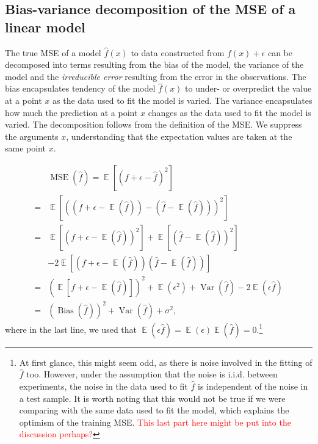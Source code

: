 \documentclass[twocolumn,english,notitlepage]{article}
\newcommand{\comment}[1]{\textcolor{red}{#1}}
\newcommand{\pclosed}[1]{\left(#1\right)}
\newcommand{\bclosed}[1]{\left[#1\right]}
\renewcommand{\expval}{\operatorname{\mathbb{E}}}
\renewcommand{\var}{\operatorname{Var}}
\newcommand{\bias}{\operatorname{Bias}}
\begin{document}
\renewcommand{\theequation}{\thesection.\arabic{equation}}
\begin{appendices}
    \section{Bias-variance decomposition of the MSE of a linear model} \label{app:sec:bvdecomp}
        The true MSE of a model $\hat{f}(x)$ to data constructed from $f(x) + \epsilon$ can be decomposed into terms resulting from the bias of the model, the variance of the model and the \textit{irreducible error} resulting from the error in the observations. The bias encapsulates tendency of the model $\hat{f}(x)$ to under- or overpredict the value at a point $x$ as the data used to fit the model is varied. The variance encapsulates how much the prediction at a point $x$ changes as the data used to fit the model is varied. The decomposition follows from the definition of the MSE. We suppress the arguments $x$, understanding that the expectation values are taken at the same point $x$.

        \begin{align} \nonumber
            &\operatorname{MSE}(\hat{f}) = \expval\bclosed{(f+\epsilon-\hat{f})^2} \\ \nonumber
            =& \expval\bclosed{\pclosed{(f+\epsilon-\expval(\hat{f}))- (\hat{f}-\expval(\hat{f}))}^2} \\ \nonumber
            =& \expval\bclosed{\pclosed{f+\epsilon-\expval(\hat{f})}^2} + \expval\bclosed{\pclosed{\hat{f}-\expval(\hat{f})}^2} \\ \nonumber
            &-2 \expval\bclosed{ (f+\epsilon-\expval(\hat{f})) (\hat{f}-\expval(\hat{f})) } \\ \nonumber
            =& \pclosed{\expval\bclosed{f+\epsilon-\expval(\hat{f})}}^2 + \expval(\epsilon^2) + \var(\hat{f}) - 2\expval(\epsilon \hat{f}) \\
            =& \pclosed{\bias(\hat{f})}^2 + \var(\hat{f}) + \sigma^2,
        \end{align}
        where in the last line, we used that $\expval(\epsilon\hat{f}) = \expval(\epsilon)\expval(\hat{f})=0$.\footnote{At first glance, this might seem odd, as there is noise involved in the fitting of $\hat{f}$ too. However, under the assumption that the noise is i.i.d. between experiments, the noise in the data used to fit $\hat{f}$ is independent of the noise in a test sample. It is worth noting that this would not be true if we were comparing with the same data used to fit the model, which explains the optimism of the training MSE. \comment{This last part here might be put into the discussion perhaps?}}


\end{appendices}
\end{document}
